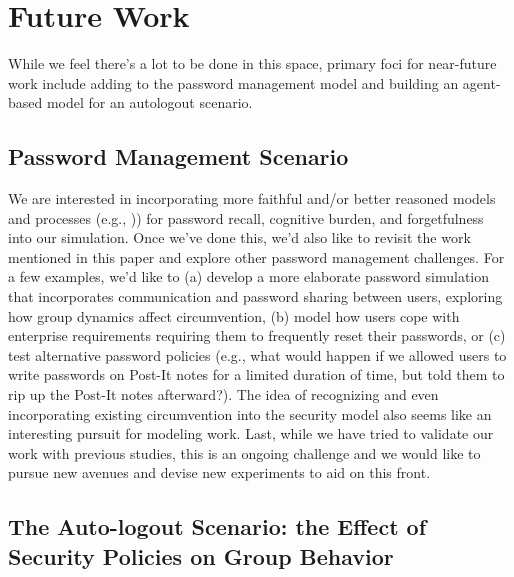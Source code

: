 \documentclass[conference]{IEEEtran}
\begin{document}
{\section{Future Work}
\label{future_work}

While we feel there's a lot to be done in this space, primary foci for 
near-future work include adding to the password 
management model and building an agent-based model for an 
autologout scenario.

\subsection{Password Management Scenario}

We are interested in incorporating more faithful and/or better reasoned 
models and processes (e.g., \cite{florencio2014password})) for password 
recall, cognitive burden, and forgetfulness into our simulation. Once we've 
done this, we'd also like to revisit the work mentioned in this 
paper and explore other password management challenges. For a few examples, 
we'd like to (a) develop a more elaborate password simulation that 
incorporates communication and password sharing between users, exploring 
how group dynamics affect circumvention, (b) model how users cope with 
enterprise requirements requiring them to frequently reset their 
passwords, or (c) test alternative password policies (e.g., what would 
happen if we allowed users to write passwords on Post-It notes for a 
limited duration of time, but told them to rip up the Post-It notes afterward?). 
The idea of recognizing and even incorporating existing circumvention into 
the security model also seems like an interesting pursuit for modeling work. 
Last, while we have tried to validate our work with previous studies, this is 
an ongoing challenge and we would like to pursue new avenues and devise 
new experiments to aid on this front.

\subsection{The
  Auto-logout Scenario: the Effect of Security Policies on Group
  Behavior}
\label{auto-logout}

}
\end{document}
